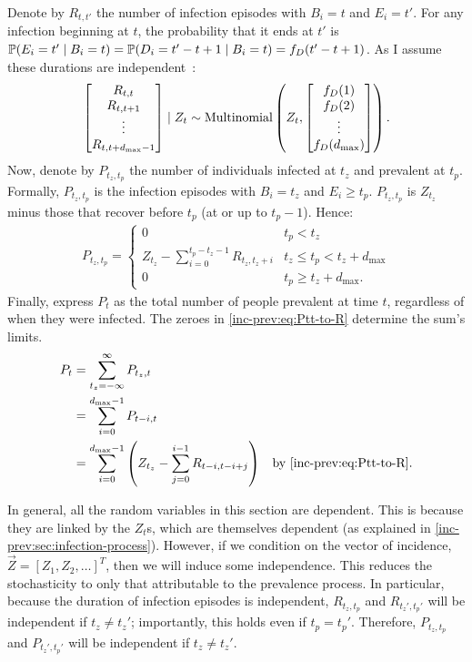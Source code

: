 \documentclass[thesis.tex]{subfiles}
\begin{document}
Denote by $R_{t,t'}$ the number of infection episodes with $B_i=t$ and $E_i=t'$.
For any infection beginning at $t$, the probability that it ends at $t'$ is $\operatorname{\mathbb{P}}(E_i = t' \mid B_i = t) = \operatorname{\mathbb{P}}(D_i = t' - t + 1 \mid B_i = t) = f_D(t' - t + 1)$.
As I assume these durations are independent~\autocite{paganoHIV}:
\begin{align}
\begin{bmatrix}
  R_{t,t} \\ R_{t,t+1} \\ \vdots \\ R_{t,t+d_\text{max}-1}
\end{bmatrix} \mid Z_t
\sim \operatorname{Multinomial} \left(
  Z_t, 
  \begin{bmatrix}
    f_D(1) \\ f_D(2) \\ \vdots \\ f_D(d_\text{max})
  \end{bmatrix}
\right).
\end{align}
Now, denote by $P_{t_z,t_p}$ the number of individuals infected at $t_z$ and prevalent at $t_p$.
Formally, $P_{t_z,t_p}$ is the infection episodes with $B_i = t_z$ and $E_i \geq t_p$.
$P_{t_z,t_p}$ is $Z_{t_z}$ minus those that recover before $t_p$ (\ie at or up to $t_p - 1$).
Hence:
\begin{align}
    P_{t_z,t_p} = \begin{cases}
      0 &t_p < t_z\\
      Z_{t_z} - \sum_{i=0}^{t_p-t_z-1} R_{t_z,t_z+i} &t_z \leq t_p < t_z + d_\text{max}\\
      0 &t_p \geq t_z + d_\text{max}.
  \end{cases} \label{inc-prev:eq:Ptt-to-R}
\end{align}
Finally, express $P_t$ as the total number of people prevalent at time $t$, regardless of when they were infected.
The zeroes in \cref{inc-prev:eq:Ptt-to-R} determine the sum's limits.
\begin{align}
  P_t
  &= \sum_{t_z=-\infty}^\infty P_{t_z,t} \\
  &= \sum_{i=0}^{\dmax-1} P_{t-i,t} \label{inc-prev:eq:Pt-to-Ptt} \\
  &= \sum_{i=0}^{\dmax-1} \left(Z_{t_z} - \sum_{j=0}^{i-1} R_{t-i,t-i+j} \right) &\text{by \cref{inc-prev:eq:Ptt-to-R}}\label{inc-prev:eq:Pt-to-Rtt}.
\end{align}

In general, all the random variables in this section are dependent.
This is because they are linked by the $Z_t$s, which are themselves dependent (as explained in \cref{inc-prev:sec:infection-process}).
However, if we condition on the vector of incidence, $\vec{Z} = [Z_1, Z_2, \dots]^T$, then we will induce some independence.
This reduces the stochasticity to only that attributable to the prevalence process.
In particular, because the duration of infection episodes is independent, $R_{t_z,t_p}$ and $R_{t_z',t_p'}$ will be independent if $t_z \neq t_z'$; importantly, this holds even if $t_p = t_p'$.
Therefore, $P_{t_z,t_p}$ and $P_{t_z',t_p'}$ will be independent if $t_z \neq t_z'$.
\end{document}
